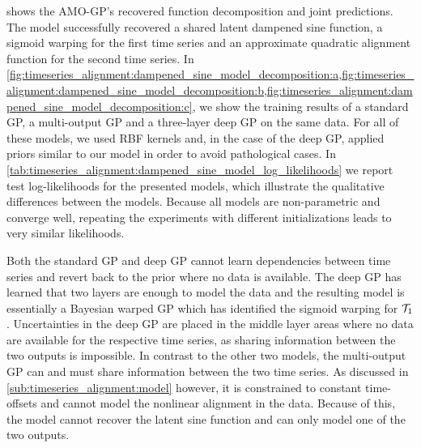  shows the AMO-GP's recovered function decomposition and joint predictions.
The model successfully recovered a shared latent dampened sine function, a sigmoid warping for the first time series and an approximate quadratic alignment function for the second time series.
In \cref{fig:timeseries_alignment:dampened_sine_model_decomposition:a,fig:timeseries_alignment:dampened_sine_model_decomposition:b,fig:timeseries_alignment:dampened_sine_model_decomposition:c}, we show the training results of a standard GP, a multi-output GP and a three-layer deep GP on the same data.
For all of these models, we used RBF kernels and, in the case of the deep GP, applied priors similar to our model in order to avoid pathological cases.
In \cref{tab:timeseries_alignment:dampened_sine_model_log_likelihoods} we report test log-likelihoods for the presented models, which illustrate the qualitative differences between the models.
Because all models are non-parametric and converge well, repeating the experiments with different initializations leads to very similar likelihoods.

Both the standard GP and deep GP cannot learn dependencies between time series and revert back to the prior where no data is available.
The deep GP has learned that two layers are enough to model the data and the resulting model is essentially a Bayesian warped GP which has identified the sigmoid warping for $\mathcal{T}_1$.
Uncertainties in the deep GP are placed in the middle layer areas where no data are available for the respective time series, as sharing information between the two outputs is impossible.
In contrast to the other two models, the multi-output GP can and must share information between the two time series.
As discussed in \cref{sub:timeseries_alignment:model} however, it is constrained to constant time-offsets and cannot model the nonlinear alignment in the data.
Because of this, the model cannot recover the latent sine function and can only model one of the two outputs.


